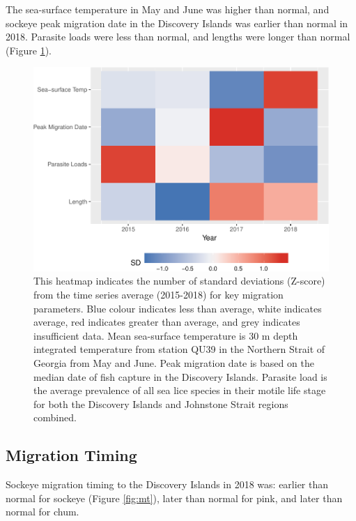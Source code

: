 \documentclass[fleqn,10pt]{wlpeerj} %
\begin{document}
The sea-surface temperature in May and June was higher than normal, and
sockeye peak migration date in the Discovery Islands was earlier than
normal in 2018. Parasite loads were less than normal, and lengths were
longer than normal (Figure \ref{fig:heatmap}).

\begin{figure}
\includegraphics[width=0.8\linewidth]{peer_j_migration_dynamics_files/figure-latex/heatmap-1} \caption{This heatmap indicates the number of standard deviations (Z-score) from the time series average (2015-2018) for key migration parameters. Blue colour indicates less than average, white indicates average, red indicates greater than average, and grey indicates insufficient data. Mean sea-surface temperature is 30 m depth integrated temperature from station QU39 in the Northern Strait of Georgia from May and June. Peak migration date is based on the median date of fish capture in the Discovery Islands. Parasite load is the average prevalence of all sea lice species in their motile life stage for both the Discovery Islands and Johnstone Strait regions combined.}\label{fig:heatmap}
\end{figure}

\subsection*{Migration Timing}\label{migration-timing}

Sockeye migration timing to the Discovery Islands in 2018 was: earlier
than normal for sockeye (Figure \ref{fig:mt}), later than normal for
pink, and later than normal for chum.
\end{document}
